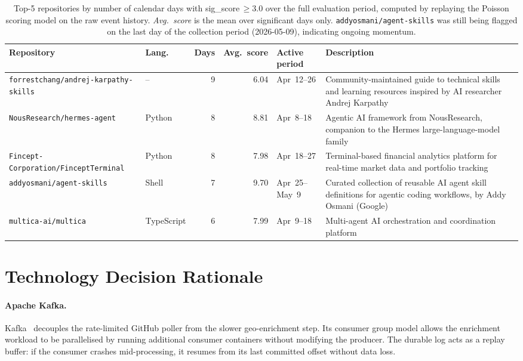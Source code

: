 \documentclass[sigconf]{acmart}
\begin{document}
\begin{table}[tp]
  \caption{Top-5 repositories by number of calendar days with
    sig\_score\,$\geq 3.0$ over the full evaluation period, computed by
    replaying the Poisson scoring model on the raw event history.
    \emph{Avg.\ score} is the mean over significant days only.
    \texttt{addyosmani/agent-skills} was still being flagged on the last day
    of the collection period (2026-05-09), indicating ongoing momentum.}
  \label{tab:sustained}
  \small
  \begin{tabularx}{\textwidth}{l l r r l X}
    \toprule
    \textbf{Repository} & \textbf{Lang.}
      & \textbf{Days} & \textbf{Avg.\ score}
      & \textbf{Active period} & \textbf{Description} \\
    \midrule
    \texttt{forrestchang/andrej-karpathy-skills}
      & -- & 9 & 6.04 & Apr~12--26
      & Community-maintained guide to technical skills and learning resources
        inspired by AI researcher Andrej Karpathy \\
    \texttt{NousResearch/hermes-agent}
      & Python & 8 & 8.81 & Apr~8–18
      & Agentic AI framework from NousResearch, companion to the Hermes
        large-language-model family \\
    \texttt{Fincept-Corporation/FinceptTerminal}
      & Python & 8 & 7.98 & Apr~18–27
      & Terminal-based financial analytics platform for real-time market data
        and portfolio tracking \\
    \texttt{addyosmani/agent-skills}
      & Shell & 7 & 9.70 & Apr~25–May~9
      & Curated collection of reusable AI agent skill definitions for agentic
        coding workflows, by Addy Osmani (Google) \\
    \texttt{multica-ai/multica}
      & TypeScript & 6 & 7.99 & Apr~9–18
      & Multi-agent AI orchestration and coordination platform \\
    \bottomrule
  \end{tabularx}
\end{table}
\newpage
\section{Technology Decision Rationale}
\label{sec:decisions}

\paragraph{Apache Kafka.}
Kafka~\cite{kafka} decouples the rate-limited GitHub poller from the
slower geo-enrichment step. Its consumer group model allows the enrichment
workload to be parallelised by running additional consumer containers without
modifying the producer. The durable log acts as a replay buffer: if the
consumer crashes mid-processing, it resumes from its last committed offset
without data loss.
\end{document}

